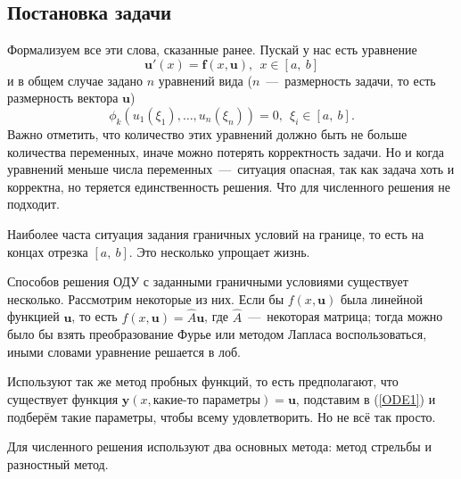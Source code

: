 \documentclass[a4,14pt,russian]{article}
\begin{document}
\subsection{Постановка задачи}
    Формализуем все эти слова, сказанные ранее. Пускай у нас есть уравнение
    \begin{equation}\label{ODE1}
     \boldsymbol u'(x) = \boldsymbol f(x, \boldsymbol u),\ \ x \in [a,\ b]
    \end{equation}
    и в общем случае задано $n$ уравнений вида ($n$~---~размерность задачи, то есть размерность вектора $\boldsymbol u$)
    \begin{equation}
     \phi_k(u_1(\xi_1),\ldots,u_n(\xi_n))=0,\ \ \xi_i \in [a,\ b].
    \end{equation}
    Важно отметить, что количество этих уравнений должно быть не больше количества переменных, иначе можно потерять корректность задачи. Но и когда уравнений меньше числа переменных~---~ситуация опасная, так как задача хоть и корректна, но теряется единственность решения. Что для численного решения не подходит.
    \par
    Наиболее часта ситуация задания граничных условий на границе, то есть на концах отрезка $[a,\ b]$. Это несколько упрощает жизнь.
    \par
    Способов решения ОДУ с заданными граничными условиями существует несколько. Рассмотрим некоторые из них. Если бы $f(x, \boldsymbol u)$ была линейной функцией $\boldsymbol u$, то есть $f(x, \boldsymbol u) = \hat A \boldsymbol u$, где $\hat A$~---~некоторая матрица; тогда можно было бы взять преобразование Фурье или методом Лапласа воспользоваться, иными словами уравнение решается в лоб.\par
    Используют так же метод пробных функций, то есть предполагают, что существует функция $\boldsymbol y (x, \text{какие-то параметры}) = \boldsymbol u$, подставим в (\ref{ODE1}) и подберём такие параметры, чтобы всему удовлетворить. Но не всё так просто.
    \par
    Для численного решения используют два основных метода: метод стрельбы и разностный метод.
    
\end{document}

